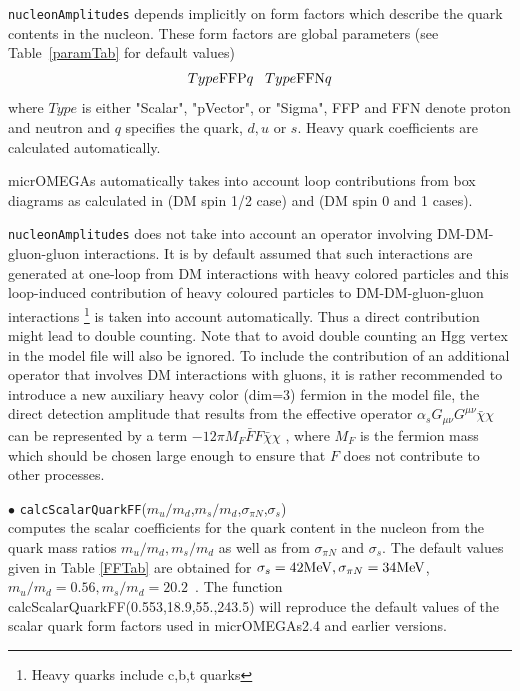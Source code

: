 \documentclass[12pt,a4paper]{article}
\begin{document}
\verb|nucleonAmplitudes| depends implicitly on form factors which describe the 
quark contents in the nucleon. These form factors are global parameters (see
Table~\ref{paramTab} for
default values)
\begin{equation}
Type{\rm FFP}q \;\;\; Type{\rm FFN}q \nonumber
\end{equation} 
where $Type$ is either "Scalar", "pVector", or "Sigma",  FFP and FFN denote proton and neutron  and
$q$ specifies the quark, $d,u$  or $s$. Heavy quark coefficients are calculated automatically.

micrOMEGAs automatically takes into account loop contributions  from box
diagrams as calculated in \cite{Drees:1993bu} (DM spin 1/2 case) and \cite{Hisano:2015bma}
(DM spin 0 and 1 cases).

\verb|nucleonAmplitudes| 
 does not take into account an operator involving DM-DM-gluon-gluon   interactions. It is by default assumed that such interactions
are generated at one-loop from DM interactions with heavy colored particles and  this loop-induced contribution of heavy coloured particles  to DM-DM-gluon-gluon  interactions \footnote{Heavy quarks  include c,b,t quarks}  is taken into account automatically.  Thus a direct contribution might lead to double counting. Note that to avoid double counting an Hgg vertex in the model file will also be ignored. 
To include the contribution of an additional operator that involves DM interactions with gluons, it is rather recommended to introduce a new 
auxiliary heavy color (dim=3) fermion in the model file,  the direct detection amplitude that results from the effective operator 
 $\alpha_s G_{\mu\nu}G^{\mu\nu} \bar{\chi}\chi$  can be  represented by a term   $-12 \pi  M_F \bar{F} F \bar{\chi}\chi$  ,
where $M_F$  is the fermion mass  which should be chosen large enough to ensure that
$F$ does not contribute to other processes. 


\noindent$\bullet$
{\tt calcScalarQuarkFF}($m_u/m_d$,$m_s/m_d$,$\sigma_{\pi N}$,$\sigma_s$)\\
computes the scalar coefficients for the quark content in the nucleon from the quark mass ratios
$m_u/m_d, m_s/m_d$ as well as from $\sigma_{\pi N}$ and $\sigma_s$.
The default values given in Table  \ref{FFTab} are obtained for 
$\sigma_s=42{\rm MeV},\sigma_{\pi N}=34{\rm MeV}$, $m_u/m_d=0.56, m_s/m_d=20.2$~\cite{Beringer:1900zz}.
The function calcScalarQuarkFF(0.553,18.9,55.,243.5)  will reproduce   the default values of the  scalar quark
form factors used in micrOMEGAs2.4 and earlier  versions.
\end{document}
